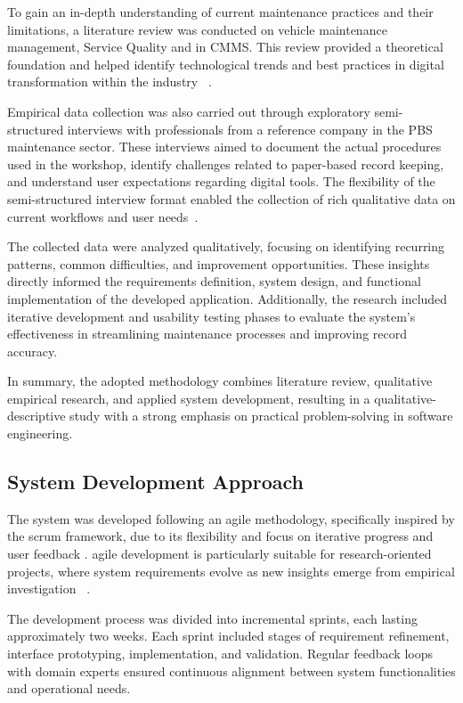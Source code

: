To gain an in-depth understanding of current maintenance practices and their limitations, a literature review was conducted on vehicle maintenance management, Service Quality and in \ac{CMMS}. This review provided a theoretical foundation and helped identify technological trends and best practices in digital transformation within the industry ~\cite{Yin_2018, Saunders_2019}.

Empirical data collection was also carried out through exploratory semi-structured interviews with professionals from a reference company in the \acs{PBS} maintenance sector. These interviews aimed to document the actual procedures used in the workshop, identify challenges related to paper-based record keeping, and understand user expectations regarding digital tools. The flexibility of the semi-structured interview format enabled the collection of rich qualitative data on current workflows and user needs~\cite{Quivy_2008}.

The collected data were analyzed qualitatively, focusing on identifying recurring patterns, common difficulties, and improvement opportunities. These insights directly informed the requirements definition, system design, and functional implementation of the developed application. Additionally, the research included iterative development and usability testing phases to evaluate the system's effectiveness in streamlining maintenance processes and improving record accuracy.

In summary, the adopted methodology combines literature review, qualitative empirical research, and applied system development, resulting in a qualitative-descriptive study with a strong emphasis on practical problem-solving in software engineering.

\subsection{System Development Approach}
\label{subsec:agile}

The system was developed following an \acs{agile} methodology, specifically inspired by the \acs{scrum} framework, due to its flexibility and focus on iterative progress and user feedback \cite{Agile_2008}. \acs{agile} development is particularly suitable for research-oriented projects, where system requirements evolve as new insights emerge from empirical investigation ~\cite{Beck_2001, Pressman_2020}.

The development process was divided into incremental sprints, each lasting approximately two weeks. Each sprint included stages of requirement refinement, interface prototyping, implementation, and validation. Regular feedback loops with domain experts ensured continuous alignment between system functionalities and operational needs.

